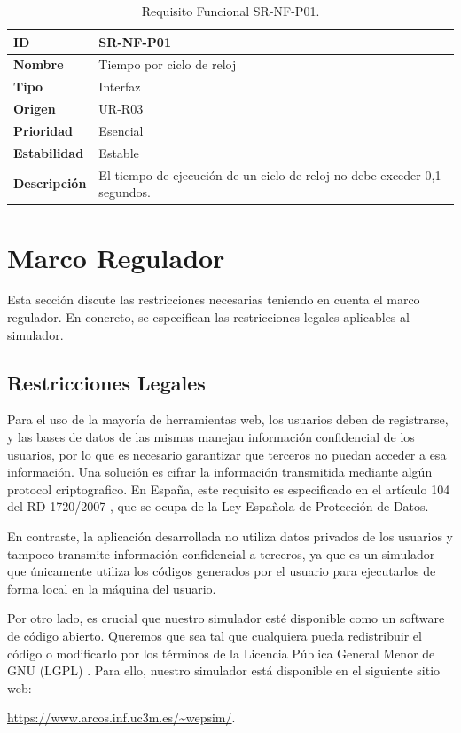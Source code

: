 \begin{center}
\begin{table}[htbp]
\centering
\begin{tabular}{@{}p{2.5cm} p{9cm}@{}} 
\toprule
\textbf{ID} 				& SR-NF-P01 \\
\midrule
\textbf{Nombre} 			& Tiempo por ciclo de reloj \\
\midrule
\textbf{Tipo} 			& Interfaz \\
\midrule
\textbf{Origen} 			& UR-R03 \\
\midrule
\textbf{Prioridad}		& Esencial \\
\midrule
\textbf{Estabilidad} 		& Estable \\
\midrule
\textbf{Descripción} 	& El tiempo de ejecución de un ciclo de reloj no debe exceder 0,1 segundos. \\
\bottomrule
\end{tabular}
\caption{Requisito Funcional SR-NF-P01.}
\label{tab:srnfp01}
\end{table}
\end{center}

\vspace{10 mm}


\section{Marco Regulador}
\label{sec:regulatory_framework}

Esta sección discute las restricciones necesarias teniendo en cuenta el marco regulador. En concreto, se especifican las restricciones legales aplicables al simulador.

\subsection{Restricciones Legales}
\label{sec:legal_constraints}

Para el uso de la mayoría de herramientas web, los usuarios deben de registrarse, y las bases de datos de las mismas manejan información confidencial de los usuarios, por lo que es necesario garantizar que terceros no puedan acceder a esa información. Una solución es cifrar la información transmitida mediante algún \gls{protocol} criptografico. En España, este requisito es especificado en el artículo 104 del RD 1720/2007 \cite{boe2008}, que se ocupa de la Ley Española de Protección de Datos.


En contraste, la aplicación desarrollada no utiliza datos privados de los usuarios y tampoco transmite información confidencial a terceros, ya que es un simulador que únicamente utiliza los códigos generados por el usuario para ejecutarlos de forma local en la máquina del usuario.


Por otro lado, es crucial que nuestro simulador esté disponible como un software de código abierto. Queremos que sea tal que cualquiera pueda redistribuir el código o modificarlo por los términos de la Licencia Pública General Menor de GNU (LGPL) \cite{gnulgpl}. Para ello, nuestro simulador está disponible en el siguiente sitio web: 

\url{https://www.arcos.inf.uc3m.es/~wepsim/}.

